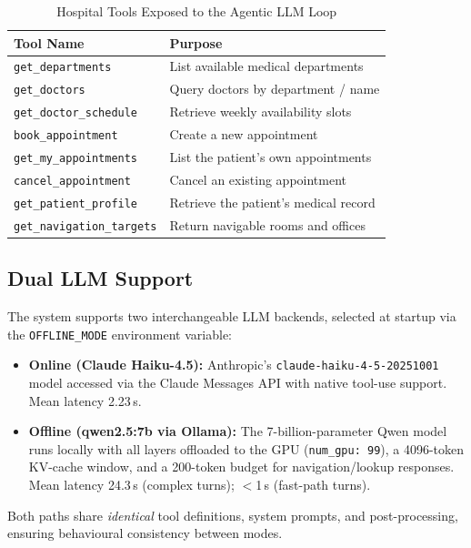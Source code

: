 \documentclass[conference]{IEEEtran}
\begin{document}
\begin{table}[t]
\caption{Hospital Tools Exposed to the Agentic LLM Loop}
\label{tab:tools}
\centering
\renewcommand{\arraystretch}{1.1}
\begin{tabular}{ll}
\toprule
\textbf{Tool Name} & \textbf{Purpose} \\
\midrule
\texttt{get\_departments}        & List available medical departments \\
\texttt{get\_doctors}            & Query doctors by department / name \\
\texttt{get\_doctor\_schedule}   & Retrieve weekly availability slots \\
\texttt{book\_appointment}       & Create a new appointment \\
\texttt{get\_my\_appointments}   & List the patient's own appointments \\
\texttt{cancel\_appointment}     & Cancel an existing appointment \\
\texttt{get\_patient\_profile}   & Retrieve the patient's medical record \\
\texttt{get\_navigation\_targets}& Return navigable rooms and offices \\
\bottomrule
\end{tabular}
\end{table}

\subsection{Dual LLM Support}

The system supports two interchangeable LLM backends, selected at startup via
the \texttt{OFFLINE\_MODE} environment variable:

\begin{itemize}
  \item \textbf{Online (Claude Haiku-4.5):} Anthropic's \texttt{claude-haiku-4-5-20251001}
        model accessed via the Claude Messages API with native tool-use support.
        Mean latency 2.23\,s.
  \item \textbf{Offline (qwen2.5:7b via Ollama):} The 7-billion-parameter Qwen
        model runs locally with all layers offloaded to the GPU
        (\texttt{num\_gpu:\,99}), a 4096-token KV-cache window, and a 200-token
        budget for navigation/lookup responses.
        Mean latency 24.3\,s (complex turns); $<$1\,s (fast-path turns).
\end{itemize}

Both paths share \emph{identical} tool definitions, system prompts, and
post-processing, ensuring behavioural consistency between modes.
\end{document}

